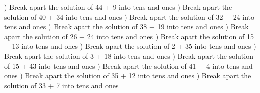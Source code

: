 \documentclass{article}%
\begin{document}
\newline%
\newline%
) Break apart the solution of 44 + 9 into tens and ones%
\newline%
\newline%
) Break apart the solution of 40 + 34 into tens and ones%
\newline%
\newline%
) Break apart the solution of 32 + 24 into tens and ones%
\newline%
\newline%
) Break apart the solution of 38 + 19 into tens and ones%
\newline%
\newline%
) Break apart the solution of 26 + 24 into tens and ones%
\newline%
\newline%
) Break apart the solution of 15 + 13 into tens and ones%
\newline%
\newline%
) Break apart the solution of 2 + 35 into tens and ones%
\newline%
\newline%
) Break apart the solution of 3 + 18 into tens and ones%
\newline%
\newline%
) Break apart the solution of 15 + 43 into tens and ones%
\newline%
\newline%
) Break apart the solution of 41 + 4 into tens and ones%
\newline%
\newline%
) Break apart the solution of 35 + 12 into tens and ones%
\newline%
\newline%
) Break apart the solution of 33 + 7 into tens and ones%
\newline%
\newline%
\end{document}
